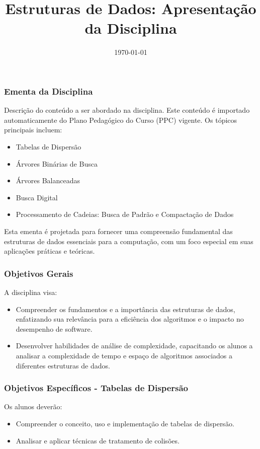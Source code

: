 \title{Estruturas de Dados: Apresentação da Disciplina}
\date{\today}
\frame{\titlepage}

\begin{frame}
  \frametitle{Ementa da Disciplina}
  Descrição do conteúdo a ser abordado na disciplina. Este conteúdo é importado automaticamente do Plano Pedagógico do Curso (PPC) vigente. Os tópicos principais incluem:
  \begin{itemize}
    \item Tabelas de Dispersão
    \item Árvores Binárias de Busca
    \item Árvores Balanceadas
    \item Busca Digital
    \item Processamento de Cadeias: Busca de Padrão e Compactação de Dados
  \end{itemize}
  Esta ementa é projetada para fornecer uma compreensão fundamental das estruturas de dados essenciais para a computação, com um foco especial em suas aplicações práticas e teóricas.
\end{frame}

\begin{frame}
  \frametitle{Objetivos Gerais}
  A disciplina visa:
  \begin{itemize}
    \item Compreender os fundamentos e a importância das estruturas de dados, enfatizando sua relevância para a eficiência dos algoritmos e o impacto no desempenho de software.
    \item Desenvolver habilidades de análise de complexidade, capacitando os alunos a analisar a complexidade de tempo e espaço de algoritmos associados a diferentes estruturas de dados.
  \end{itemize}
\end{frame}


\begin{frame}
  \frametitle{Objetivos Específicos - Tabelas de Dispersão}
  Os alunos deverão:
  \begin{itemize}
    \item Compreender o conceito, uso e implementação de tabelas de dispersão.
    \item Analisar e aplicar técnicas de tratamento de colisões.
  \end{itemize}
\end{frame}


